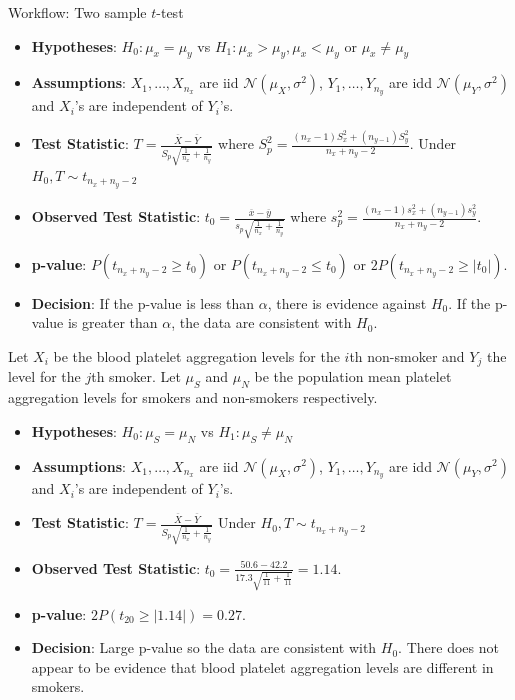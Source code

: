 \documentclass[a4paper]{article}
\begin{document}
\begin{redbox}{Workflow: Two sample \( t \)-test}
	\begin{itemize}
		\item \textbf{Hypotheses}: \( H_0: \mu_x = \mu_y \) vs \( H_1: \mu_x > \mu_y, \mu_x < \mu_y \) or \( \mu_x \neq \mu_y \)
		\item \textbf{Assumptions}: \( X_1,\dots,X_{n_x} \) are iid \( \mathcal{N} (\mu_X,\sigma^2) \), \( Y_1,\dotsc,Y_{n_y} \) are idd \( \mathcal{N} (\mu_Y,\sigma^2) \) and \( X_i \)'s are independent of \( Y_i \)'s.
		\item \textbf{Test Statistic}: \( T = \frac{\overline{X} - \overline{Y}}{S_p \sqrt{\frac{1}{n_x}+\frac{1}{n_y}}} \) where \( S^2_p = \frac{(n_x -1)S^2_x + (n_{y-1})S^2_y}{n_x + n_y -2} \). Under \( H_0, T \sim t_{n_x + n_y - 2} \) 
		\item \textbf{Observed Test Statistic}: \( t_0 = \frac{\overline{x} - \overline{y}}{s_p \sqrt{\frac{1}{n_x}+\frac{1}{n_y}}} \) where \( s^2_p = \frac{(n_x -1)s^2_x + (n_{y-1})s^2_y}{n_x + n_y -2} \).
		\item \textbf{p-value}: \( P(t_{n_x + n_y - 2} \geq t_0) \) or \( P(t_{n_x + n_y -2} \leq t_0) \) or \( 2P(t_{n_x + n_y - 2} \geq \lvert t_0 \rvert) \).
		\item \textbf{Decision}: If the p-value is less than \( \alpha \), there is evidence against \( H_0 \). If the p-value is greater than \( \alpha \), the data are consistent with \( H_0 \).
	\end{itemize}
\end{redbox}
Let \( X_i \) be the blood platelet aggregation levels for the \( i \)th non-smoker and \( Y_j \) the level for the \( j \)th smoker. Let \( \mu_S \) and \( \mu_N \) be the population mean platelet aggregation levels for smokers and non-smokers respectively.
\begin{itemize}
	\item \textbf{Hypotheses}: \( H_0: \mu_S = \mu_N \) vs \( H_1: \mu_S \neq \mu_N \)
	\item \textbf{Assumptions}: \( X_1,\dots,X_{n_x} \) are iid \( \mathcal{N} (\mu_X,\sigma^2) \), \( Y_1,\dotsc,Y_{n_y} \) are idd \( \mathcal{N} (\mu_Y,\sigma^2) \) and \( X_i \)'s are independent of \( Y_i \)'s.
	\item \textbf{Test Statistic}: \( T = \frac{\overline{X} - \overline{Y}}{S_p \sqrt{\frac{1}{n_x}+\frac{1}{n_y}}} \) Under \( H_0, T \sim t_{n_x + n_y - 2} \) 
	\item \textbf{Observed Test Statistic}: \( t_0 = \frac{50.6 - 42.2}{17.3 \sqrt{\frac{1}{11}+ \frac{1}{11}}} = 1.14 \).
	\item \textbf{p-value}: \( 2P(t_{20} \geq \lvert 1.14 \rvert) = 0.27 \).
	\item \textbf{Decision}: Large p-value so the data are consistent with \( H_0 \). There does not appear to be evidence that blood platelet aggregation levels are different in smokers.
\end{itemize}
\end{document}
